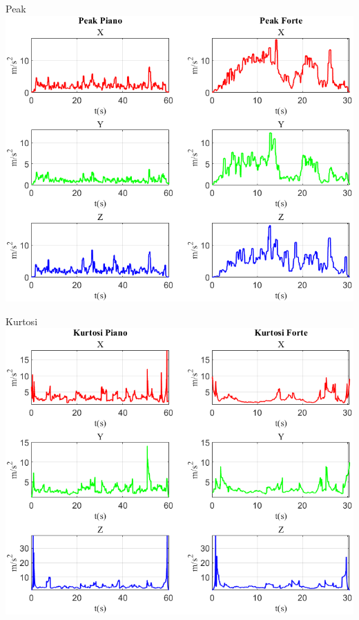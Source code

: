 \documentclass[beamer]{standalone}
\begin{document}
	\begin{frame}{{Peak}}
		\centering\includegraphics[height=.8\textheight]{figure/Acc/Peak}
	\end{frame}
	
		\begin{frame}{{Kurtosi}}
				\centering\includegraphics[height=.8\textheight]{figure/Acc/Kurtosi}
			\end{frame}
	
\end{document}
